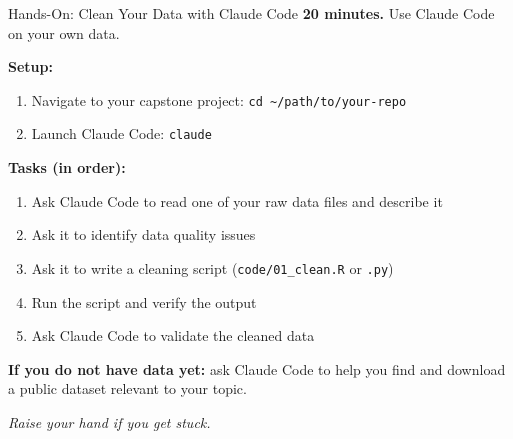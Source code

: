 \begin{frame}{Hands-On: Clean Your Data with Claude Code}
  \textbf{\textcolor{usfgreen}{20 minutes.}} Use Claude Code on your own data.

  \vspace{4pt}

  \textbf{Setup:}
  \begin{enumerate}
    \item Navigate to your capstone project: \texttt{cd \textasciitilde/path/to/your-repo}
    \item Launch Claude Code: \texttt{claude}
  \end{enumerate}

  \vspace{4pt}

  \textbf{Tasks (in order):}
  \begin{enumerate}
    \item Ask Claude Code to read one of your raw data files and describe it
    \item Ask it to identify data quality issues
    \item Ask it to write a cleaning script (\texttt{code/01\_clean.R} or \texttt{.py})
    \item Run the script and verify the output
    \item Ask Claude Code to validate the cleaned data
  \end{enumerate}

  \vspace{4pt}

  \textbf{If you do not have data yet:} ask Claude Code to help you find and download a public dataset relevant to your topic.

  \vspace{4pt}

  \textit{Raise your hand if you get stuck.}
\end{frame}

